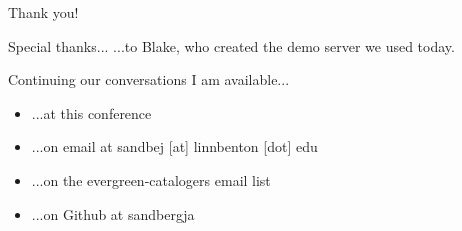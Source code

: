 \documentclass{beamer}
\begin{document}
\begin{frame}{Thank you!}

\begin{block}{Special thanks...}
...to Blake, who created the demo server we used today.
\end{block}

\begin{block}{Continuing our conversations}
I am available...
\begin{itemize}
 \item ...at this conference
 \item ...on email at sandbej [at] linnbenton [dot] edu
 \item ...on the evergreen-catalogers email list
 \item ...on Github at sandbergja
\end{itemize}

\end{block}



\end{frame}
\end{document}
